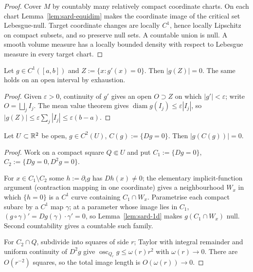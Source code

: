 \begin{proof}
Cover $M$ by countably many relatively compact coordinate charts.  On each
chart Lemma~\ref{lem:sard-equidim} makes the coordinate image of the critical
set Lebesgue-null.  Target coordinate changes are locally $C^1$, hence locally
Lipschitz on compact subsets, and so preserve null sets.  A countable union is
null.  A smooth volume measure has a locally bounded density with respect to
Lebesgue measure in every target chart.
\end{proof}

\begin{lemma}\label{lem:sard-1d}
Let $g\in C^1([a,b])$ and $Z:=\{x:g'(x)=0\}$.  Then $|g(Z)|=0$.  The same
holds on an open interval by exhaustion.
\end{lemma}

\begin{proof}
Given $\varepsilon>0$, continuity of $g'$ gives an open $O\supset Z$ on which
$|g'|<\varepsilon$; write $O=\bigsqcup_jI_j$.  The mean value theorem gives
$\operatorname{diam}g(I_j)\le\varepsilon|I_j|$, so
$|g(Z)|\le\varepsilon\sum_j|I_j|\le\varepsilon(b-a)$.
\end{proof}

\begin{lemma}\label{lem:sard-2d}
Let $U\subset\mathbb R^2$ be open, $g\in C^2(U)$, $C(g):=\{Dg=0\}$.  Then
$|g(C(g))|=0$.
\end{lemma}

\begin{proof}
Work on a compact square $Q\Subset U$ and put $C_1:=\{Dg=0\}$,
$C_2:=\{Dg=0,D^2g=0\}$.

For $x\in C_1\setminus C_2$ some $h:=\partial_ig$ has $Dh(x)\ne0$; the
elementary implicit-function argument (contraction mapping in one coordinate)
gives a neighbourhood $W_x$ in which $\{h=0\}$ is a $C^1$ curve containing
$C_1\cap W_x$.  Parametrise each compact subarc by a $C^1$ map $\gamma$; at a
parameter whose image lies in $C_1$, $(g\circ\gamma)'=Dg(\gamma)\cdot\gamma'=0$,
so Lemma~\ref{lem:sard-1d} makes $g(C_1\cap W_x)$ null.  Second countability
gives a countable such family.

For $C_2\cap Q$, subdivide into squares of side $r$; Taylor with integral
remainder and uniform continuity of $D^2g$ give
$\operatorname{osc}_{Q_r}g\le\omega(r)r^2$ with $\omega(r)\to0$.  There are
$O(r^{-2})$ squares, so the total image length is $O(\omega(r))\to0$.
\end{proof}

